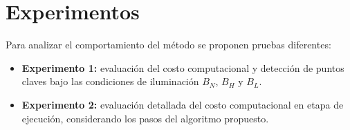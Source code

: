 \section{Experimentos}%
Para analizar el comportamiento del método se proponen pruebas diferentes:
% 
% 
\begin{itemize}
 \item \textbf{Experimento 1:} evaluación del costo computacional y detección de puntos claves bajo las condiciones de iluminación $B_{N}$, $B_{H}$ y $B_{L}$.
 \item \textbf{Experimento 2:} evaluación detallada del costo computacional en etapa de ejecución, considerando los pasos del algoritmo propuesto.
\end{itemize}
